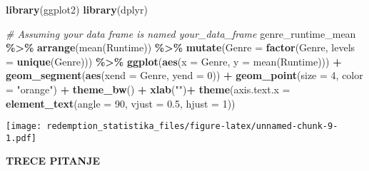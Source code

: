 \documentclass[
]{article}
\newenvironment{Shaded}{\begin{snugshade}}{\end{snugshade}}
\newcommand{\AttributeTok}[1]{\textcolor[rgb]{0.13,0.29,0.53}{#1}}
\newcommand{\CommentTok}[1]{\textcolor[rgb]{0.56,0.35,0.01}{\textit{#1}}}
\newcommand{\DecValTok}[1]{\textcolor[rgb]{0.00,0.00,0.81}{#1}}
\newcommand{\FloatTok}[1]{\textcolor[rgb]{0.00,0.00,0.81}{#1}}
\newcommand{\FunctionTok}[1]{\textcolor[rgb]{0.13,0.29,0.53}{\textbf{#1}}}
\newcommand{\NormalTok}[1]{#1}
\newcommand{\OtherTok}[1]{\textcolor[rgb]{0.56,0.35,0.01}{#1}}
\newcommand{\SpecialCharTok}[1]{\textcolor[rgb]{0.81,0.36,0.00}{\textbf{#1}}}
\newcommand{\StringTok}[1]{\textcolor[rgb]{0.31,0.60,0.02}{#1}}
\begin{document}
\begin{Shaded}
\begin{Highlighting}[]
\FunctionTok{library}\NormalTok{(ggplot2)}
\FunctionTok{library}\NormalTok{(dplyr)}

\CommentTok{\# Assuming your data frame is named \textquotesingle{}your\_data\_frame\textquotesingle{}}
\NormalTok{genre\_runtime\_mean }\SpecialCharTok{\%\textgreater{}\%}
  \FunctionTok{arrange}\NormalTok{(}\StringTok{\textasciigrave{}}\AttributeTok{mean(Runtime)}\StringTok{\textasciigrave{}}\NormalTok{) }\SpecialCharTok{\%\textgreater{}\%}
  \FunctionTok{mutate}\NormalTok{(}\AttributeTok{Genre =} \FunctionTok{factor}\NormalTok{(Genre, }\AttributeTok{levels =} \FunctionTok{unique}\NormalTok{(Genre))) }\SpecialCharTok{\%\textgreater{}\%}
  \FunctionTok{ggplot}\NormalTok{(}\FunctionTok{aes}\NormalTok{(}\AttributeTok{x =}\NormalTok{ Genre, }\AttributeTok{y =} \StringTok{\textasciigrave{}}\AttributeTok{mean(Runtime)}\StringTok{\textasciigrave{}}\NormalTok{)) }\SpecialCharTok{+}
    \FunctionTok{geom\_segment}\NormalTok{(}\FunctionTok{aes}\NormalTok{(}\AttributeTok{xend =}\NormalTok{ Genre, }\AttributeTok{yend =} \DecValTok{0}\NormalTok{)) }\SpecialCharTok{+}
    \FunctionTok{geom\_point}\NormalTok{(}\AttributeTok{size =} \DecValTok{4}\NormalTok{, }\AttributeTok{color =} \StringTok{"orange"}\NormalTok{) }\SpecialCharTok{+}
    \FunctionTok{theme\_bw}\NormalTok{() }\SpecialCharTok{+}
    \FunctionTok{xlab}\NormalTok{(}\StringTok{""}\NormalTok{)}\SpecialCharTok{+}
    \FunctionTok{theme}\NormalTok{(}\AttributeTok{axis.text.x =} \FunctionTok{element\_text}\NormalTok{(}\AttributeTok{angle =} \DecValTok{90}\NormalTok{, }\AttributeTok{vjust =} \FloatTok{0.5}\NormalTok{, }\AttributeTok{hjust =} \DecValTok{1}\NormalTok{))}
\end{Highlighting}
\end{Shaded}

\texttt{[image: redemption\_statistika\_files/figure-latex/unnamed-chunk-9-1.pdf]}

\textbf{TRECE PITANJE}

\begin{Shaded}
\end{Shaded}
\end{document}
